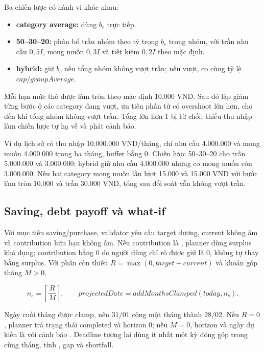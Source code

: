 Ba chiến lược có hành vi khác nhau:

\begin{itemize}
  \item \textbf{category average:} dùng $b_c$ trực tiếp.
  \item \textbf{50--30--20:} phân bổ trần nhóm theo tỷ trọng $b_c$ trong nhóm, với trần nhu cầu $0{,}5I$, mong muốn $0{,}3I$ và tiết kiệm $0{,}2I$ theo mặc định.
  \item \textbf{hybrid:} giữ $b_c$ nếu tổng nhóm không vượt trần; nếu vượt, co cùng tỷ lệ $cap/groupAverage$.
\end{itemize}

Mỗi hạn mức thô được làm tròn theo  mặc định 10.000 VND. Sau đó  lặp giảm từng bước ở các category đang vượt, ưu tiên phần tử có overshoot lớn hơn, cho đến khi tổng nhóm không vượt trần. Tổng  lớn hơn 1 bị từ chối; thiếu thu nhập làm chiến lược tự hạ về  và phát cảnh báo.

Ví dụ lịch sử có thu nhập 10.000.000 VND/tháng, chi nhu cầu 4.000.000 và mong muốn 4.000.000 trong ba tháng, buffer bằng 0. Chiến lược 50--30--20 cho trần 5.000.000 và 3.000.000; hybrid giữ nhu cầu 4.000.000 nhưng co mong muốn còn 3.000.000. Nếu hai category mong muốn lần lượt 15.000 và 15.000 VND với bước làm tròn 10.000 và trần 30.000 VND, tổng sau đối soát vẫn không vượt trần.

\subsection{Saving, debt payoff và what-if}

Với mục tiêu saving/purchase, validator yêu cầu target dương, current không âm và contribution hữu hạn không âm. Nếu contribution là , planner dùng surplus khả dụng; contribution bằng 0 do người dùng chỉ rõ được giữ là 0, không tự thay bằng surplus. Với phần còn thiếu $R=\max(0,target-current)$ và khoản góp tháng $M>0$,

\begin{equation}
  n_s=\left\lceil\frac{R}{M}\right\rceil,
  \qquad projectedDate=addMonthsClamped(today,n_s).
\end{equation}

Ngày cuối tháng được clamp, nên 31/01 cộng một tháng thành 28/02. Nếu $R=0$, planner trả trạng thái completed và horizon 0; nếu $M=0$, horizon và ngày dự kiến là  với cảnh báo . Deadline tương lai dùng ít nhất một kỳ đóng góp trong cùng tháng, tính , gap và shortfall.

